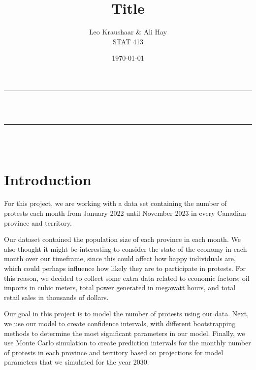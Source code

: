 \documentclass[12pt]{article}
\title{Title}
\author{Leo Kraushaar \& Ali Hay \\ STAT 413}
\date{\today}
\begin{document}
\onehalfspacing

\begin{titlepage}
  \newcommand{\HRule}{\rule{\linewidth}{0.5mm}}
  \center

  \HRule \\[1cm]
  { \huge \bfseries \thetitle}\\[0.4cm]
  \HRule \\[1.8cm]

  \Large \thedate\\[5cm]

  \begin{minipage}{1\textwidth}
    \vspace{10cm}
    \begin{flushleft} \large
      \theauthor
    \end{flushleft}

  \end{minipage}
\end{titlepage}

\newpage
\section{Introduction}
For this project, we are working with a data set containing the number of protests each month from January 2022 until November 2023 in every Canadian province and territory.

Our dataset contained the population size of each province in each month. We also thought it might be interesting to consider the state of the economy in each month over our timeframe, since this could affect how happy individuals are, which could perhaps influence how likely they are to participate in protests. For this reason, we decided to collect some extra data related to economic factors: oil imports in cubic meters, total power generated in megawatt hours, and total retail sales in thousands of dollars.

Our goal in this project is to model the number of protests using our data. Next, we use our model to create confidence intervals, with different bootstrapping methods to determine the most significant parameters in our model. Finally, we use Monte Carlo simulation to create prediction intervals for the monthly number of protests in each province and territory based on projections for model parameters that we simulated for the year 2030.
\end{document}
